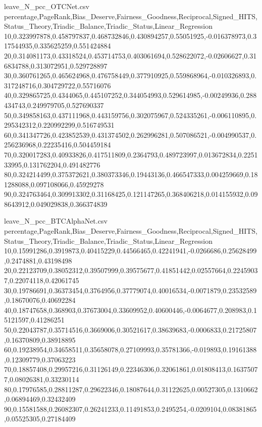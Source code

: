 \begin{filecontents*}{leave_N_pcc_OTCNet.csv}
percentage,PageRank,Bias_Deserve,Fairness_Goodness,Reciprocal,Signed_HITS,Status_Theory,Triadic_Balance,Triadic_Status,Linear_Regression
10,0.323997878,0.458797837,0.468732846,0.430894257,0.55051925,-0.016378973,0.317544935,0.335625259,0.551424884
20,0.314081173,0.43318524,0.453714753,0.403061694,0.528622072,-0.02606627,0.316834788,0.313072951,0.529728897
30,0.360761265,0.465624968,0.476758449,0.377910925,0.559868964,-0.010326893,0.317248716,0.304729722,0.55716076
40,0.329865725,0.4344065,0.445107252,0.344054993,0.529614985,-0.00249936,0.288434743,0.249979705,0.527690337
50,0.349858163,0.437111968,0.443159756,0.302075967,0.524335261,-0.006110895,0.295342312,0.220992299,0.516749531
60,0.341347726,0.423852539,0.431374502,0.262996281,0.507086521,-0.004990537,0.256236968,0.22235416,0.504459184
70,0.320017283,0.40933826,0.417511809,0.2364793,0.489723997,0.013672834,0.225133995,0.131762204,0.491482776
80,0.324214499,0.375372621,0.380373346,0.19443136,0.466547333,0.004259669,0.181288088,0.097108066,0.45929278
90,0.324763464,0.309913302,0.31168425,0.121147265,0.368406218,0.014155932,0.098643912,0.049029838,0.366374839
\end{filecontents*}

\begin{filecontents*}{leave_N_pcc_BTCAlphaNet.csv}
percentage,PageRank,Bias_Deserve,Fairness_Goodness,Reciprocal,Signed_HITS,Status_Theory,Triadic_Balance,Triadic_Status,Linear_Regression
10,0.15991286,0.3919873,0.40415229,0.44566465,0.42241941,-0.0266686,0.25628499,0.2474881,0.43198498
20,0.22123709,0.38052312,0.39507999,0.39575677,0.41851442,0.02557664,0.22459037,0.22074118,0.42061745
30,0.19786691,0.36373454,0.3764956,0.37779074,0.40016534,-0.0071879,0.23532589,0.18670076,0.40692284
40,0.18747658,0.368903,0.37673004,0.33609952,0.40600446,-0.0064677,0.208983,0.15121597,0.41286251
50,0.22043787,0.35714516,0.3669006,0.30521617,0.38639683,-0.0006833,0.21725807,0.16370809,0.38918895
60,0.19238954,0.34658511,0.35658078,0.27109993,0.35781366,-0.019893,0.19161388,0.12309779,0.37063223
70,0.18857408,0.29957216,0.31126149,0.22346306,0.32061861,0.01808413,0.16375077,0.08026381,0.33230114
80,0.17976585,0.28811287,0.29622346,0.18087644,0.31122625,0.00527305,0.1310662,0.06894469,0.32432409
90,0.15581588,0.26082307,0.26241233,0.11491853,0.2495254,-0.0209104,0.08381865,0.05525305,0.27184409
\end{filecontents*}

